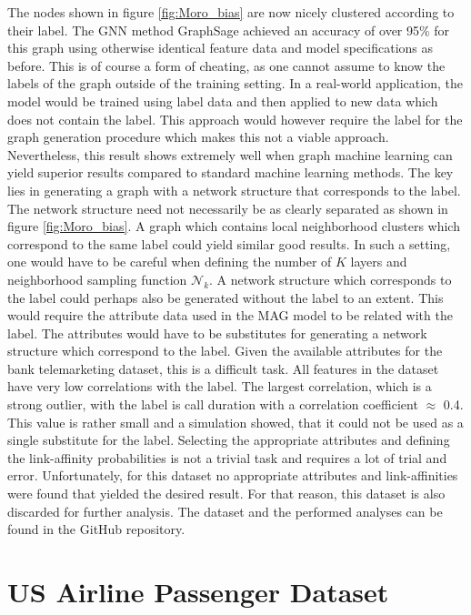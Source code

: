   \noindent The nodes shown in figure \ref{fig:Moro_bias} are now nicely
  clustered according to their label. The GNN method GraphSage achieved an 
  accuracy of over 95\% for this graph using otherwise identical feature data
  and model specifications as before. This is of course a form of cheating, as 
  one cannot assume to know the labels of the graph outside of the training 
  setting. In a real-world application, the model would be trained using label
  data and then applied to new data which does not contain the label. This
  approach would however require the label for the graph generation procedure 
  which makes this not a viable approach. Nevertheless, this result shows 
  extremely well when graph machine learning can yield superior results compared 
  to standard machine learning methods. The key lies in generating a graph with 
  a network structure that corresponds to the label. The network structure need not
  necessarily be as clearly separated as shown in figure \ref{fig:Moro_bias}. A
  graph which contains local neighborhood clusters which correspond to the same
  label could yield similar good results. In such a setting, one would have to be
  careful when defining the number of $K$ layers and neighborhood sampling 
  function $\mathcal{N}_{k}$. A network structure which corresponds to
  the label could perhaps also be generated without the label to an extent. This 
  would require the attribute data used in the MAG model to be related with the
  label. The attributes would have to be substitutes for generating a network
  structure which correspond to the label. Given the available attributes for
  the bank telemarketing dataset, this is a difficult task. All features in the 
  dataset have very low correlations with the label. The largest correlation, 
  which is a strong outlier, with the label is call duration with a correlation 
  coefficient $\approx$ 0.4. This value is rather small and a simulation showed, 
  that it could not be used as a single substitute for the label. Selecting the
  appropriate attributes and defining the link-affinity probabilities is not a
  trivial task and requires a lot of trial and error. Unfortunately, for this
  dataset no appropriate attributes and link-affinities were found that yielded
  the desired result. For that reason, this dataset is also discarded for
  further analysis. The dataset and the performed analyses can be found in the 
  GitHub repository. 

  \section{US Airline Passenger Dataset}
  \label{section:airline_data}

